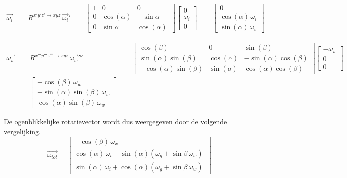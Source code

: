 \begin{equation*}
\begin{split}
\overrightarrow{\omega_{i}}
&=R^{x'y'z' \rightarrow xyz}\,\overrightarrow{\omega_{i}}'
&=	  \begin{bmatrix}
      1 & 0 & 0\\
      0 & \cos(\alpha) & -\sin{\alpha}\\ 
      0 & \sin{\alpha} & \cos(\alpha)\
      \end{bmatrix}
      \begin{bmatrix}
      0\\
      \omega_{i}\\
      0\
      \end{bmatrix}     
&=	  \begin{bmatrix}
      0\\
      \cos(\alpha)\,\omega_{i}\\
      \sin(\alpha)\,\omega_{i}\
      \end{bmatrix}
\end{split}
\end{equation*}

\begin{equation*}
\begin{split}
\overrightarrow{\omega_{w}}
&=R^{x'''y'''z''' \rightarrow xyz}\,\overrightarrow{\omega_{w}}'''
&=	  \begin{bmatrix}
      \cos(\beta) & 0 & \sin(\beta)\\
      \sin(\alpha)\sin(\beta) & \cos(\alpha) & -\sin(\alpha)\cos(\beta)\\
      -\cos(\alpha)\sin(\beta) & \sin(\alpha) & \cos(\alpha)\cos(\beta)\  
      \end{bmatrix}
      \begin{bmatrix}
      -\omega_{w}\\
      0\\
      0\
      \end{bmatrix}\\
&=    \begin{bmatrix}
      -\cos(\beta)\,\omega_{w}\\
      -\sin(\alpha)\sin(\beta)\,\omega_{w}\\
      \cos(\alpha)\sin(\beta)\,\omega_{w}\
      \end{bmatrix}
\end{split}
\end{equation*}

De ogenblikkelijke rotatievector wordt dus weergegeven door de volgende vergelijking.
\begin{equation*}
\overrightarrow{\omega_{tot}}=
	\begin{bmatrix}
	-\cos(\beta)\,\omega_{w}\\
	\cos(\alpha)\,\omega_{i} - \sin(\alpha)(\omega_{g}+\sin{\beta}\,\omega_{w})\\
	\sin(\alpha)\,\omega_{i} + \cos(\alpha)(\omega_{g}+\sin{\beta}\,\omega_{w})\
	\end{bmatrix}
\end{equation*}

